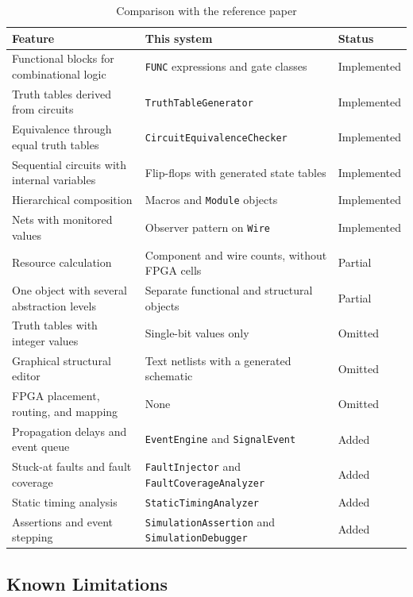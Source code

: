 \begin{table}[H]
\centering
\small
\caption{Comparison with the reference paper}
\label{tab:comparison}
\begin{tabular}{>{\raggedright\arraybackslash}p{5.6cm}>{\raggedright\arraybackslash}p{6.8cm}l}
\toprule
\textbf{Feature} & \textbf{This system} & \textbf{Status} \\
\midrule
Functional blocks for combinational logic & \texttt{FUNC} expressions and gate classes & Implemented \\
Truth tables derived from circuits & \texttt{TruthTableGenerator} & Implemented \\
Equivalence through equal truth tables & \texttt{CircuitEquivalenceChecker} & Implemented \\
Sequential circuits with internal variables & Flip-flops with generated state tables & Implemented \\
Hierarchical composition & Macros and \texttt{Module} objects & Implemented \\
Nets with monitored values & Observer pattern on \texttt{Wire} & Implemented \\
Resource calculation & Component and wire counts, without FPGA cells & Partial \\
One object with several abstraction levels & Separate functional and structural objects & Partial \\
Truth tables with integer values & Single-bit values only & Omitted \\
Graphical structural editor & Text netlists with a generated schematic & Omitted \\
FPGA placement, routing, and mapping & None & Omitted \\
Propagation delays and event queue & \texttt{EventEngine} and \texttt{SignalEvent} & Added \\
Stuck-at faults and fault coverage & \texttt{FaultInjector} and \texttt{FaultCoverageAnalyzer} & Added \\
Static timing analysis & \texttt{StaticTimingAnalyzer} & Added \\
Assertions and event stepping & \texttt{SimulationAssertion} and \texttt{SimulationDebugger} & Added \\
\bottomrule
\end{tabular}
\end{table}

\subsection{Known Limitations}
\label{sec:limitations}

